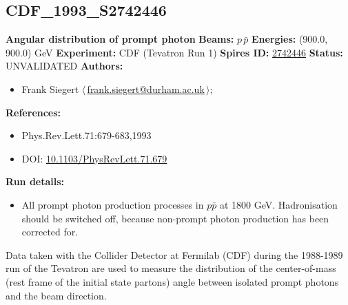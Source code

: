 \subsection[CDF\_1993\_S2742446]{CDF\_1993\_S2742446\,\cite{Abe:1993cv}}
\textbf{Angular distribution of prompt photon}\newline
\textbf{Beams:} $p$\,$\bar{p}$ \newline
\textbf{Energies:} (900.0, 900.0) GeV \newline
\textbf{Experiment:} CDF (Tevatron Run 1) \newline
\textbf{Spires ID:} \href{http://www.slac.stanford.edu/spires/find/hep/www?rawcmd=key+2742446}{2742446}\newline
\textbf{Status:} UNVALIDATED\newline
\textbf{Authors:}
\begin{itemize}
  \item Frank Siegert $\langle\,$\href{mailto:frank.siegert@durham.ac.uk}{frank.siegert@durham.ac.uk}$\,\rangle$;
\end{itemize}
\textbf{References:}
\begin{itemize}
  \item Phys.Rev.Lett.71:679-683,1993
  \item DOI: \href{http://dx.doi.org/10.1103/PhysRevLett.71.679}{10.1103/PhysRevLett.71.679}
\end{itemize}
\textbf{Run details:}
\begin{itemize}

  \item All prompt photon production processes in $p \bar{p}$ at 1800 GeV. Hadronisation should be switched off, because non-prompt photon production has been corrected for.\end{itemize}

\noindent Data taken with the Collider Detector at Fermilab (CDF) during the 1988-1989 run of the Tevatron are used to measure the distribution of the center-of-mass (rest frame of the initial state partons) angle between isolated prompt photons and the beam direction.

\clearpage


\clearpage

